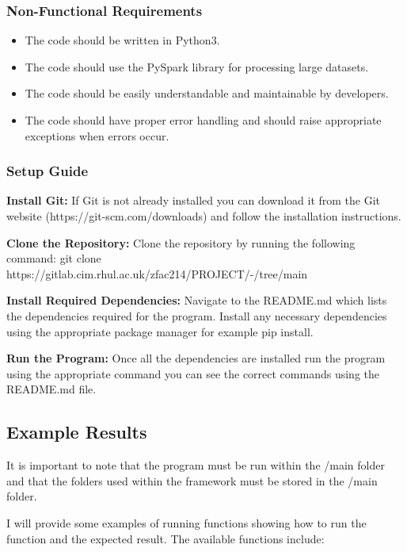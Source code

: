 \documentclass[]{final_report}
\begin{document}
\subsubsection{Non-Functional Requirements}

\begin{itemize}
    \item The code should be written in Python3.
    \item The code should use the PySpark library for processing large datasets.
    \item The code should be easily understandable and maintainable by developers.
    \item The code should have proper error handling and should raise appropriate exceptions when errors occur.
\end{itemize}

\subsubsection{Setup Guide}

\textbf{Install Git:} If Git is not already installed you can download it from the Git website (https://git-scm.com/downloads) and follow the installation instructions.

\textbf{Clone the Repository:} Clone the repository by running the following command: git clone https://gitlab.cim.rhul.ac.uk/zfac214/PROJECT/-/tree/main

\textbf{Install Required Dependencies:} Navigate to the README.md which lists the dependencies required for the program. Install any necessary dependencies using the appropriate package manager for example pip install.

\textbf{Run the Program:} Once all the dependencies are installed run the program using the appropriate command you can see the correct commands using the README.md file.

\clearpage

\subsection{Example Results}

It is important to note that the program must be run within the /main folder and that the folders used within the framework must be stored in the /main folder.

I will provide some examples of running functions showing how to run the function and the expected result. The available functions include:
\end{document}
